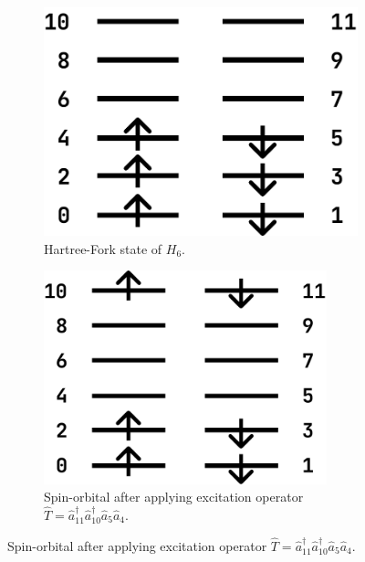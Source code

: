 \begin{figure}
    \centering
    \begin{subfigure}{0.3\textwidth}
        \centering
        \includegraphics[width=\textwidth]{images/6_1_h6_a.pdf}
        \caption{Hartree-Fork state of $H_6$.}
        \label{6_1_h6_a}
    \end{subfigure}
    \begin{subfigure}{0.3\textwidth}
        \centering
        \includegraphics[width=0.9\textwidth]{images/6_1_h6_b.pdf}
        \caption{Spin-orbital after applying excitation operator $\hat{T}=\hat{a}_{11}^\dagger \hat{a}_{10}^\dagger \hat{a}_5 \hat{a}_4$.}
        \label{6_1_h6_b}
    \end{subfigure}
\end{figure}
